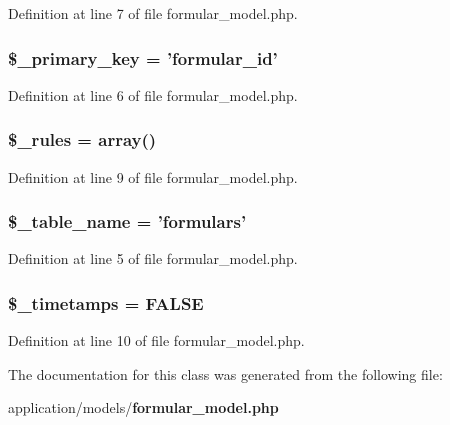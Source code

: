 Definition at line 7 of file formular\-\_\-model.\-php.

\subsubsection[{\$\-\_\-primary\-\_\-key}]{\setlength{\rightskip}{0pt plus 5cm}\$\-\_\-primary\-\_\-key = 'formular\-\_\-id'\hspace{0.3cm}{\ttfamily [protected]}}\label{class_formular__model_a1befeb0c72587cd2574cd7d1818d66b8}


Definition at line 6 of file formular\-\_\-model.\-php.

\subsubsection[{\$\-\_\-rules}]{\setlength{\rightskip}{0pt plus 5cm}\$\-\_\-rules = array()\hspace{0.3cm}{\ttfamily [protected]}}\label{class_formular__model_a2432b65e7e8b8a8328a1c47ab6ca0409}


Definition at line 9 of file formular\-\_\-model.\-php.

\subsubsection[{\$\-\_\-table\-\_\-name}]{\setlength{\rightskip}{0pt plus 5cm}\$\-\_\-table\-\_\-name = 'formulars'\hspace{0.3cm}{\ttfamily [protected]}}\label{class_formular__model_a90ebc25e748e2696e00b5c5cf3255ee4}


Definition at line 5 of file formular\-\_\-model.\-php.

\subsubsection[{\$\-\_\-timetamps}]{\setlength{\rightskip}{0pt plus 5cm}\$\-\_\-timetamps = F\-A\-L\-S\-E\hspace{0.3cm}{\ttfamily [protected]}}\label{class_formular__model_a0af45edfd9d801cbc582a244700cd824}


Definition at line 10 of file formular\-\_\-model.\-php.



The documentation for this class was generated from the following file\-:\begin{DoxyCompactItemize}
\item 
application/models/{\bf formular\-\_\-model.\-php}\end{DoxyCompactItemize}
